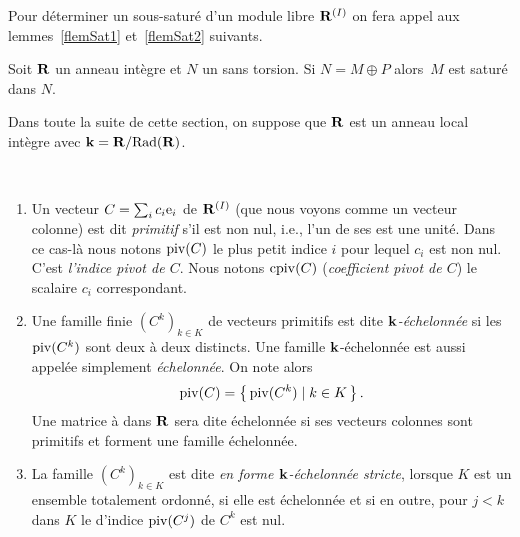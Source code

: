 Pour déterminer un sous-\Rmo saturé d'un module libre $\mathbf{R}^{(I)}$
on fera appel aux  lemmes~\ref{flemSat1} et~\ref{flemSat2} suivants.

\begin{flemma} \label{flemSat1}
Soit $\mathbf{R}$ un anneau intègre et $N$ un \Rmo sans torsion. Si $N=M\oplus P$
alors~$M$ est saturé dans $N$.
\end{flemma}

Dans toute la suite de cette section,  on suppose que $\mathbf{R}$ est un anneau local intègre \dcd avec $\mathbf{k}=\mathbf{R}/\mathrm{Rad}(\mathbf{R})$.
\begin{fdefinota} \label{fnotaPiv}~
%
\begin{enumerate}
%
\item Un vecteur $C=\sum_i c_i \mathrm{e}_i$ de $\mathbf{R}^{(I)}$ 
 (que nous voyons comme un vecteur colonne)
 est dit \textsl{primitif} s'il est \rdt non nul, i.e., l'un de ses \coes
 est une unité. Dans ce cas-là nous notons $\mathrm{piv}(C)$ le plus petit indice
 $i$ pour lequel $c_i$ est \rdt non nul. C'est \textsl{l'indice pivot de $C$}. Nous notons $\mathrm{cpiv}(C)$ 
 (\textsl{coefficient pivot de $C$}) le scalaire $c_i$ correspondant.
%
\item Une famille finie $(C^k)_{k\in K}$ de vecteurs primitifs est dite \textsl{$\mathbf{k}$-échelonnée}
si les $\mathrm{piv}(C^k)$ sont deux à deux distincts. Une famille $\mathbf{k}$-échelonnée est aussi appelée simplement  \textsl{échelonnée}.
On note alors 
  $$
  \mathrm{piv}(C)=\left\{{\,\mathrm{piv}(C^k)\mid k\in K\,}\right\}.
  $$
Une matrice à \coes dans $\mathbf{R}$ sera dite échelonnée si ses vecteurs colonnes sont primitifs et forment une famille échelonnée.
%
\item La famille $(C^k)_{k\in K}$ est dite \textsl{en forme $\mathbf{k}$-échelonnée
stricte}, lorsque $K$ est un ensemble totalement ordonné, si elle est échelonnée et si en outre, pour $j<k$ dans $K$ le \coe d'indice $\mathrm{piv}(C^j)$ de $C^k$ est nul.
%
\end{enumerate}
\end{fdefinota}

 
